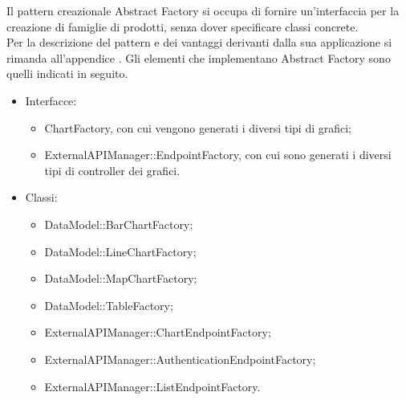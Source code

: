			Il pattern creazionale Abstract Factory si occupa di fornire un'interfaccia per la creazione di famiglie di prodotti, senza dover specificare classi concrete.\\
			Per la descrizione del pattern e dei vantaggi derivanti dalla sua applicazione si rimanda all'appendice .
				Gli elementi che implementano Abstract Factory sono quelli indicati in seguito.
				\begin{itemize}
					\item Interfacce:
					\begin{itemize}
						\item ChartFactory, con cui vengono generati i diversi tipi di grafici;
						\item ExternalAPIManager::EndpointFactory, con cui sono generati i diversi tipi di controller dei grafici.
					\end{itemize}
					\item Classi:
					\begin{itemize}
						\item DataModel::BarChartFactory;
						\item DataModel::LineChartFactory;
						\item DataModel::MapChartFactory;
						\item DataModel::TableFactory;
						\item ExternalAPIManager::ChartEndpointFactory;
						\item ExternalAPIManager::AuthenticationEndpointFactory;
						\item ExternalAPIManager::ListEndpointFactory.
					\end{itemize}
				\end{itemize}
		
